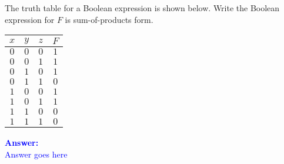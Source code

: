 \item{}
The truth table for a Boolean expression is shown below. Write the Boolean
expression for $F$ is sum-of-products form.\\[12pt]
\begin{tabular}{|c|c|c|c|}
    \hline
    {\bf $x$} & {\bf $y$} & {\bf $z$} & {\bf $F$} \\ \hline\hline
    $0$ & $0$ & $0$ & $1$ \\ \hline
    $0$ & $0$ & $1$ & $1$ \\ \hline
    $0$ & $1$ & $0$ & $1$ \\ \hline
    $0$ & $1$ & $1$ & $0$ \\ \hline
    $1$ & $0$ & $0$ & $1$ \\ \hline
    $1$ & $0$ & $1$ & $1$ \\ \hline
    $1$ & $1$ & $0$ & $0$ \\ \hline
    $1$ & $1$ & $1$ & $0$ \\ \hline
\end{tabular}
\vskip12pt
\ifanswers
\textcolor{blue}{
\textbf{Answer:}\\
Answer goes here
}
\newpage
\fi

